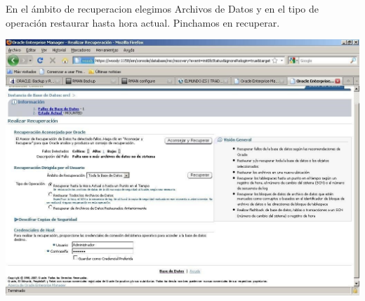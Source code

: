 \begin{enumerate}[1.]
\begin{center}
\end{center}
En el ámbito de recuperacion elegimos Archivos de Datos y en el tipo de operación restaurar hasta hora actual. Pinchamos en recuperar.
\begin{center}
\includegraphics[width=15cm]{./Imagenes/eje8}
\end{center}


	

\end{enumerate} 
